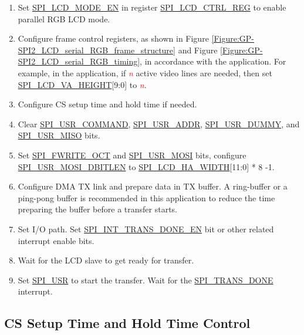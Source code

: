 \documentclass[main\_\_EN.tex]{subfiles}
\begin{document}
\begin{enumerate}
    \item Set \hyperref[fielddesc:SPILCDMODEEN]{SPI\_LCD\_MODE\_EN} in register \hyperref[regdesc:SPILCDCTRLREG]{SPI\_LCD\_CTRL\_REG} to enable parallel RGB LCD mode.

    \item Configure frame control registers, as shown in Figure \ref{Figure:GP-SPI2_LCD_serial_RGB_frame_structure} and Figure \ref{Figure:GP-SPI2_LCD_serial_RGB_timing}, in accordance with the application. For example, in the application, if \textcolor{red}{\it{n}} active video lines are needed, then set \hyperref[fielddesc:SPILCDVAHEIGHT]{SPI\_LCD\_VA\_HEIGHT}[9:0] to \textcolor{red}{\it{n}}.

    \item Configure CS setup time and hold time if needed.

    \item Clear \hyperref[fielddesc:SPIUSRCOMMAND]{SPI\_USR\_COMMAND}, \hyperref[fielddesc:SPIUSRADDR]{SPI\_USR\_ADDR}, \hyperref[fielddesc:SPIUSRDUMMY]{SPI\_USR\_DUMMY}, and \hyperref[fielddesc:SPIUSRMISO]{SPI\_USR\_MISO} bits.

    \item Set \hyperref[fielddesc:SPIFWRITEOCT]{SPI\_FWRITE\_OCT} and \hyperref[fielddesc:SPIUSRMOSI]{SPI\_USR\_MOSI} bits, configure \hyperref[fielddesc:SPIUSRMOSIDBITLEN]{SPI\_USR\_MOSI\_DBITLEN} to \hyperref[fielddesc:SPILCDHAWIDTH]{SPI\_LCD\_HA\_WIDTH}[11:0] * 8 -1.

    \item Configure DMA TX link and prepare data in TX buffer. A ring-buffer or a ping-pong buffer is recommended in this application to reduce the time preparing the buffer before a transfer starts.

    \item Set I/O path. Set \hyperref[fielddesc:SPIINTTRANSDONEEN]{SPI\_INT\_TRANS\_DONE\_EN} bit or other related interrupt enable bits.

    \item Wait for the LCD slave to get ready for transfer.

    \item Set \hyperref[fielddesc:SPIUSR]{SPI\_USR} to start the transfer. Wait for the \hyperref[fielddesc:SPITRANSDONE]{SPI\_TRANS\_DONE} interrupt.
\end{enumerate}


\subsection{CS Setup Time and Hold Time Control}\label{GP-SPI2 CS timing}
\end{document}
